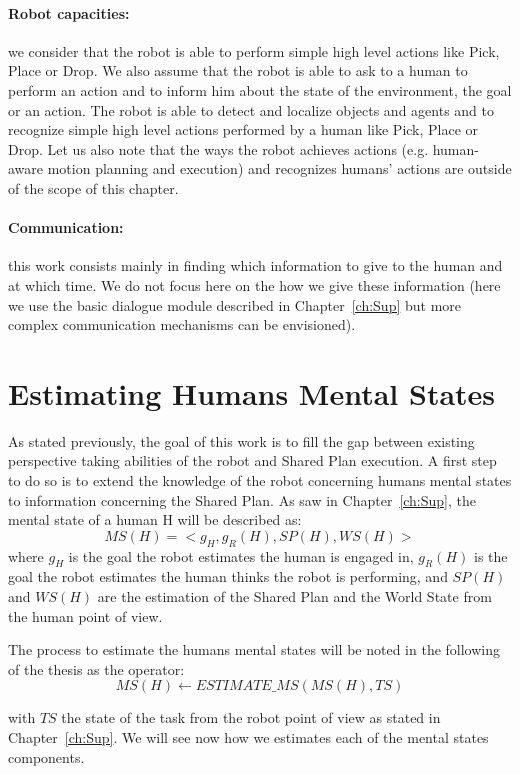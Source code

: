 \documentclass[english,a4paper,11pt,twoside]{StyleThese}
\begin{document}
\paragraph{Robot capacities:} we consider that the robot is able to perform simple high level actions like Pick, Place or Drop. We also assume that the robot is able to ask to a human to perform an action and to inform him about the state of the environment, the goal or an action. The robot is able to detect and localize objects and agents
and to recognize simple high level actions performed by a human like Pick, Place or Drop. Let us also note that the ways the robot achieves actions (e.g. human-aware motion planning and execution) and recognizes humans’ actions are outside of the scope of this chapter.

\paragraph{Communication:} this work consists mainly in finding which information to give to the human and at which time. We do not focus here on the how we give these information (here we use the basic dialogue module described in Chapter~\ref{ch:Sup} but more complex communication mechanisms can be envisioned). 

\section{Estimating Humans Mental States}

As stated previously, the goal of this work is to fill the gap between existing perspective taking abilities of the robot and Shared Plan execution. A first step to do so is to extend the knowledge of the robot concerning humans mental states to information concerning the Shared Plan. As saw in Chapter~\ref{ch:Sup}, the mental state of a human H will be described as:
$$MS(H) = <g_H, g_R(H), SP(H), WS(H)>$$
where $g_H$ is the goal the robot estimates the human is engaged in, $g_R(H)$ is the goal the robot estimates the human thinks the robot is performing, and $SP(H)$ and $WS(H)$ are the estimation of the Shared Plan and the World State from the human point of view. 

The process to estimate the humans mental states will be noted in the following of the thesis as the operator:
$$MS(H) \leftarrow ESTIMATE\_MS(MS(H), TS)$$

with $TS$ the state of the task from the robot point of view as stated in Chapter~\ref{ch:Sup}.
We will see now how we estimates each of the mental states components.
\end{document}
